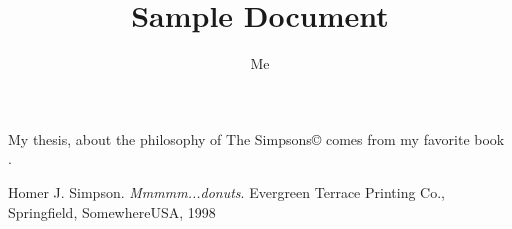 \documentclass[12pt,oneside]{scrbook}
\title{Sample Document}
\author{Me}
\begin{document}
 
My thesis, about the philosophy of The Simpsons\copyright
comes from my favorite book \cite{Simpson}.


\begin{thebibliography}{50}
 Homer J. Simpson. \textsl{Mmmmm...donuts}.
Evergreen Terrace Printing Co., Springfield, SomewhereUSA, 1998
\end{thebibliography}
\end{document}

